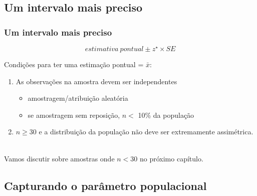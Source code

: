 
\subsection{Um intervalo mais preciso}


\begin{frame}
\frametitle{Um intervalo mais preciso}
\justifying
{}
{\[ estimativa ~ pontual \pm z^\star \times SE \] }

\pause
\justifying
Condições para ter uma estimação pontual = $\bar{x}$:
\begin{enumerate}
\justifying
\item {} As observações na amostra devem ser independentes
\begin{itemize}
\justifying
\item amostragem/atribuição aleatória
\justifying
\item se amostragem sem reposição, $n <$ 10\% da população
\end{itemize}
\justifying
\item {} $ n \ge 30 $ e a distribuição da população não deve ser extremamente assimétrica.

\end{enumerate}

$\:$ \\
\pause
\justifying
{\tiny
{} Vamos discutir sobre amostras onde $ n <30 $ no próximo capítulo.}

\end{frame}


\subsection{Capturando o parâmetro populacional}


